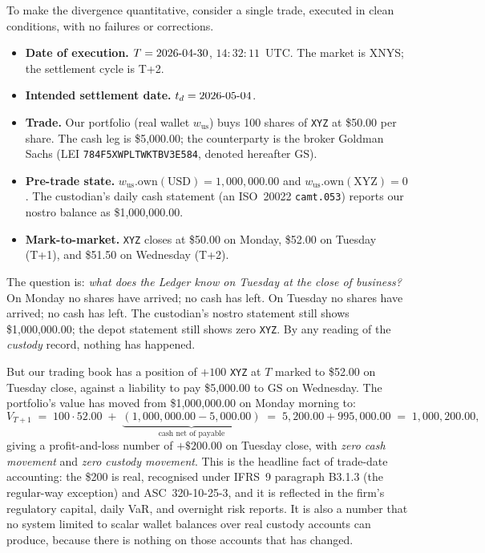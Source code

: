 \documentclass[11pt,a4paper]{article}
\begin{document}
To make the divergence quantitative, consider a single trade, executed in clean conditions, with no failures or corrections.

\begin{itemize}[nosep]
\item \textbf{Date of execution.} $T = 2026\textnormal{-}04\textnormal{-}30$, $14{:}32{:}11$~UTC. The market is XNYS; the settlement cycle is T+2.
\item \textbf{Intended settlement date.} $t_d = 2026\textnormal{-}05\textnormal{-}04$.
\item \textbf{Trade.} Our portfolio (real wallet $w_{\mathrm{us}}$) buys 100 shares of \texttt{XYZ} at \$50.00 per share. The cash leg is \$5{,}000.00; the counterparty is the broker Goldman Sachs (LEI \texttt{784F5XWPLTWKTBV3E584}, denoted hereafter $\mathrm{GS}$).
\item \textbf{Pre-trade state.} $w_{\mathrm{us}}.\mathrm{own}(\mathrm{USD}) = 1{,}000{,}000.00$ and $w_{\mathrm{us}}.\mathrm{own}(\mathrm{XYZ}) = 0$. The custodian's daily cash statement (an ISO~20022 \texttt{camt.053}) reports our nostro balance as \$1{,}000{,}000.00.
\item \textbf{Mark-to-market.} \texttt{XYZ} closes at \$50.00 on Monday, \$52.00 on Tuesday (T+1), and \$51.50 on Wednesday (T+2).
\end{itemize}

The question is: \emph{what does the Ledger know on Tuesday at the close of business?} On Monday no shares have arrived; no cash has left. On Tuesday no shares have arrived; no cash has left. The custodian's nostro statement still shows \$1{,}000{,}000.00; the depot statement still shows zero \texttt{XYZ}. By any reading of the \emph{custody} record, nothing has happened.

But our trading book has a position of $+100$ \texttt{XYZ} at $T$ marked to \$52.00 on Tuesday close, against a liability to pay \$5{,}000.00 to $\mathrm{GS}$ on Wednesday. The portfolio's value has moved from \$1{,}000{,}000.00 on Monday morning to:
\[
V_{T+1} \;=\; 100 \cdot 52.00 \;+\; \underbrace{(1{,}000{,}000.00 - 5{,}000.00)}_{\text{cash net of payable}} \;=\; 5{,}200.00 + 995{,}000.00 \;=\; 1{,}000{,}200.00,
\]
giving a profit-and-loss number of $+\$200.00$ on Tuesday close, with \emph{zero cash movement} and \emph{zero custody movement}. This is the headline fact of trade-date accounting: the \$200 is real, recognised under IFRS~9 paragraph B3.1.3 (the regular-way exception) and ASC~320-10-25-3, and it is reflected in the firm's regulatory capital, daily VaR, and overnight risk reports. It is also a number that no system limited to scalar wallet balances over real custody accounts can produce, because there is nothing on those accounts that has changed.
\end{document}
